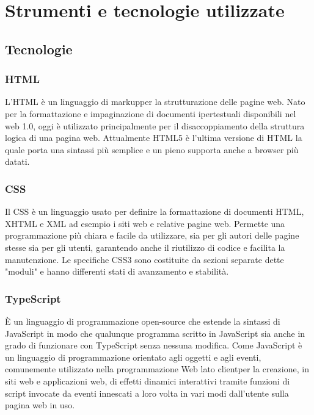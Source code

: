 \section{Strumenti e tecnologie utilizzate}

\subsection{Tecnologie}

\subsubsection*{HTML}
L'\gls{HTML} è un \gls{linguaggio di markup}\glsfirstoccur per la strutturazione delle pagine web. Nato per la formattazione e impaginazione di documenti ipertestuali disponibili nel web 1.0, oggi è utilizzato principalmente per il disaccoppiamento della struttura logica di una pagina web. Attualmente \gls{HTML}5 è l'ultima versione di \gls{HTML} la quale porta una sintassi più semplice e un pieno supporta anche a browser più datati.

\subsubsection*{CSS}
Il \gls{CSS} è un linguaggio usato per definire la formattazione di documenti \gls{HTML}, XHTML e XML ad esempio i siti web e relative pagine web. Permette una programmazione più chiara e facile da utilizzare, sia per gli autori delle pagine stesse sia per gli utenti, garantendo anche il riutilizzo di codice e facilita la manutenzione. Le specifiche \gls{CSS}3 sono costituite da sezioni separate dette "moduli" e hanno differenti stati di avanzamento e stabilità.

\subsubsection*{TypeScript}
È un linguaggio di programmazione \gls{open-source}\ap{[g]} che estende la sintassi di JavaScript in modo che qualunque programma scritto in JavaScript sia anche in grado di funzionare con TypeScript senza nessuna modifica. Come JavaScript è un linguaggio di programmazione orientato agli oggetti e agli eventi, comunemente utilizzato nella programmazione Web lato \gls{client}\glsfirstoccur per la creazione, in siti web e applicazioni web, di effetti dinamici interattivi tramite funzioni di script invocate da eventi innescati a loro volta in vari modi dall'utente sulla pagina web in uso.

